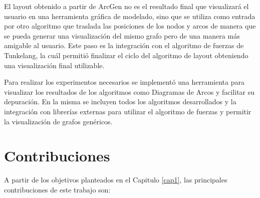 El layout obtenido  a partir de {\sc ArcGen} no es el resultado final que visualizará el usuario en una herramienta gráfica de modelado, sino que se utiliza como entrada por otro algoritmo que traslada las posiciones de los nodos y arcos de manera que se pueda generar una visualización del mismo grafo pero de una manera más amigable al usuario. Este paso es la integración con el algoritmo de fuerzas de Tunkelang, la cuál permitió finalizar el ciclo del algoritmo de layout obteniendo una visualización final utilizable.

Para realizar los experimentos necesarios se implementó una herramienta para visualizar los resultados de los algoritmos como Diagramas de Arcos y facilitar su depuración. En la misma se incluyen todos los algoritmos desarrollados y la integración con librerías externas para utilizar el algoritmo de fuerzas y permitir la visualización de grafos genéricos.

\section{Contribuciones}
A partir de los objetivos planteados en el Capitulo \ref{cap1},  las principales contribuciones de este trabajo son:


